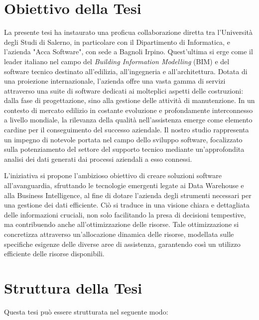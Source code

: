 \section{Obiettivo della Tesi}
La presente tesi ha instaurato una proficua collaborazione diretta tra l'Università degli Studi di Salerno, in particolare con il Dipartimento di Informatica, e l'azienda "Acca Software", con sede a Bagnoli Irpino. Quest'ultima si erge come il leader italiano nel campo del \textit{Building Information Modelling} (BIM) e del software tecnico destinato all'edilizia, all'ingegneria e all'architettura. Dotata di una proiezione internazionale, l'azienda offre una vasta gamma di servizi attraverso una suite di software dedicati ai molteplici aspetti delle costruzioni: dalla fase di progettazione, sino alla gestione delle attività di manutenzione. In un contesto di mercato edilizio in costante evoluzione e profondamente interconnesso a livello mondiale, la rilevanza della qualità nell'assistenza emerge come elemento cardine per il conseguimento del successo aziendale. Il nostro studio rappresenta un impegno di notevole portata nel campo dello sviluppo software, focalizzato sulla potenziamento del settore del supporto tecnico mediante un'approfondita analisi dei dati generati dai processi aziendali a esso connessi.

L'iniziativa si propone l'ambizioso obiettivo di creare soluzioni software all'avanguardia, sfruttando le tecnologie emergenti legate ai Data Warehouse e alla Business Intelligence, al fine di dotare l'azienda degli strumenti necessari per una gestione dei dati efficiente. Ciò si traduce in una visione chiara e dettagliata delle informazioni cruciali, non solo facilitando la presa di decisioni tempestive, ma contribuendo anche all'ottimizzazione delle risorse. Tale ottimizzazione si concretizza attraverso un'allocazione dinamica delle risorse, modellata sulle specifiche esigenze delle diverse aree di assistenza, garantendo così un utilizzo efficiente delle risorse disponibili.

\section{Struttura della Tesi}
Questa tesi può essere strutturata nel seguente modo:

